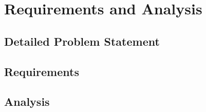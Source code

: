 \chapter{Requirements and Analysis}

\newpage


\section{Detailed Problem Statement}

\section{Requirements}

\section{Analysis}
